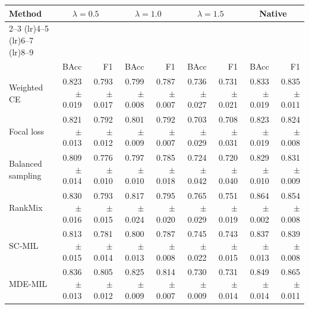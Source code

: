 \begin{tabular}{lrrrrrr|rr}
\toprule
Method & \multicolumn{2}{c}{$\lambda=0.5$} & \multicolumn{2}{c}{$\lambda=1.0$} & \multicolumn{2}{c}{$\lambda=1.5$} & \multicolumn{2}{c}{Native} \\ \cmidrule(lr){2--3} \cmidrule(lr){4--5} \cmidrule(lr){6--7} \cmidrule(lr){8--9}\\
 & BAcc & F1 & BAcc & F1 & BAcc & F1 & BAcc & F1\\
\midrule
Weighted CE & \num{0.823} $\pm$ \num{0.019} & \num{0.793} $\pm$ \num{0.017} & \num{0.799} $\pm$ \num{0.008} & \num{0.787} $\pm$ \num{0.007} & \num{0.736} $\pm$ \num{0.027} & \num{0.731} $\pm$ \num{0.021} & \num{0.833} $\pm$ \num{0.019} & \num{0.835} $\pm$ \num{0.011}\\
Focal loss & \num{0.821} $\pm$ \num{0.013} & \num{0.792} $\pm$ \num{0.012} & \num{0.801} $\pm$ \num{0.009} & \num{0.792} $\pm$ \num{0.007} & \num{0.703} $\pm$ \num{0.029} & \num{0.708} $\pm$ \num{0.031} & \num{0.823} $\pm$ \num{0.019} & \num{0.824} $\pm$ \num{0.008}\\
Balanced sampling & \num{0.809} $\pm$ \num{0.014} & \num{0.776} $\pm$ \num{0.010} & \num{0.797} $\pm$ \num{0.010} & \num{0.785} $\pm$ \num{0.018} & \num{0.724} $\pm$ \num{0.042} & \num{0.720} $\pm$ \num{0.040} & \num{0.829} $\pm$ \num{0.010} & \num{0.831} $\pm$ \num{0.009}\\
RankMix & \num{0.830} $\pm$ \num{0.016} & \num{0.793} $\pm$ \num{0.015} & \num{0.817} $\pm$ \num{0.024} & \num{0.795} $\pm$ \num{0.020} & \num{0.765} $\pm$ \num{0.029} & \num{0.751} $\pm$ \num{0.019} & \num{0.864} $\pm$ \num{0.002} & \num{0.854} $\pm$ \num{0.008}\\
SC-MIL & \num{0.813} $\pm$ \num{0.015} & \num{0.781} $\pm$ \num{0.014} & \num{0.800} $\pm$ \num{0.013} & \num{0.787} $\pm$ \num{0.008} & \num{0.745} $\pm$ \num{0.022} & \num{0.743} $\pm$ \num{0.015} & \num{0.837} $\pm$ \num{0.013} & \num{0.839} $\pm$ \num{0.008}\\
MDE-MIL & \num{0.836} $\pm$ \num{0.013} & \num{0.805} $\pm$ \num{0.012} & \num{0.825} $\pm$ \num{0.009} & \num{0.814} $\pm$ \num{0.007} & \num{0.730} $\pm$ \num{0.009} & \num{0.731} $\pm$ \num{0.014} & \num{0.849} $\pm$ \num{0.014} & \num{0.865} $\pm$ \num{0.011}\\
\bottomrule
\end{tabular}
